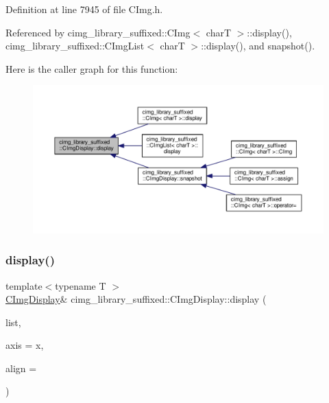Definition at line 7945 of file C\+Img.\+h.



Referenced by cimg\+\_\+library\+\_\+suffixed\+::\+C\+Img$<$ char\+T $>$\+::display(), cimg\+\_\+library\+\_\+suffixed\+::\+C\+Img\+List$<$ char\+T $>$\+::display(), and snapshot().

Here is the caller graph for this function\+:
\nopagebreak
\begin{figure}[H]
\begin{center}
\leavevmode
\includegraphics[width=350pt]{d5/d53/structcimg__library__suffixed_1_1CImgDisplay_ad08f2f8b85cdd55d5e3ea71bdebf2b67_icgraph}
\end{center}
\end{figure}
\mbox{\label{structcimg__library__suffixed_1_1CImgDisplay_a7f0ae1e5a6deb128d9a4f9501514675b}} 
\subsubsection{\texorpdfstring{display()}{display()}\hspace{0.1cm}{\footnotesize\ttfamily [2/2]}}
{\footnotesize\ttfamily template$<$typename T $>$ \\
\hyperlink{structcimg__library__suffixed_1_1CImgDisplay}{C\+Img\+Display}\& cimg\+\_\+library\+\_\+suffixed\+::\+C\+Img\+Display\+::display (\begin{DoxyParamCaption}\item[{const \hyperlink{structcimg__library__suffixed_1_1CImgList}{C\+Img\+List}$<$ T $>$ \&}]{list,  }\item[{const \hyperlink{classchar}{char}}]{axis = {\ttfamily \textquotesingle{}x\textquotesingle{}},  }\item[{const float}]{align = {} }\end{DoxyParamCaption})\hspace{0.3cm}{\ttfamily [inline]}}




